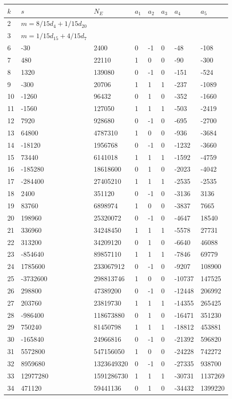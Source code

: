 \documentclass{amsart}
\begin{document}
\begin{longtable}{|l|l|l|lllll|}
\hline
$k$ & $s$ & $N_E$ & $a_1$ & $a_2$ & $a_3$ & $a_4$ & $a_5$\\
\hline
2&$m=8/15d_{4}+1/15d_{20}$&&\multicolumn{5}{c|}{}\\
3&$m=1/15d_{15}+4/15d_{7}$&&\multicolumn{5}{c|}{}\\
6&-30&2400&0&-1&0&-48&-108\\
7&480&22110&1&0&0&-90&-300\\
8&1320&139080&0&-1&0&-151&-524\\
9&-300&20706&1&1&1&-237&-1089\\
10&-1260&96432&0&1&0&-352&-1660\\
11&-1560&127050&1&1&1&-503&-2419\\
12&7920&928680&0&-1&0&-695&-2700\\
13&64800&4787310&1&0&0&-936&-3684\\
14&-18120&1956768&0&-1&0&-1232&-3660\\
15&73440&6141018&1&1&1&-1592&-4759\\
16&-185280&18618600&0&1&0&-2023&-4042\\
17&-284400&27405210&1&1&1&-2535&-2535\\
18&2400&351120&0&-1&0&-3136&3136\\
19&83760&6898974&1&0&0&-3837&7665\\
20&198960&25320072&0&-1&0&-4647&18540\\
21&336960&34248450&1&1&1&-5578&27731\\
22&313200&34209120&0&1&0&-6640&46088\\
23&-854640&89857110&1&1&1&-7846&69779\\
24&1785600&233067912&0&-1&0&-9207&108900\\
25&-3732600&298813746&1&0&0&-10737&147525\\
26&298800&47389200&0&-1&0&-12448&206992\\
27&203760&23819730&1&1&1&-14355&265425\\
28&-986400&118673880&0&1&0&-16471&351230\\
29&750240&81450798&1&1&1&-18812&453881\\
30&-165840&24966816&0&-1&0&-21392&596820\\
31&5572800&547156050&1&0&0&-24228&742272\\
32&8959680&1323649320&0&-1&0&-27335&938700\\
33&12977280&1591286730&1&1&1&-30731&1137269\\
34&471120&59441136&0&1&0&-34432&1399220\\

\end{longtable}
\end{document}
